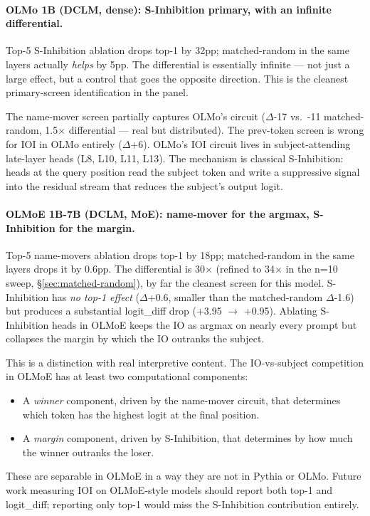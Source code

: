\documentclass[11pt]{article}
\begin{document}
\paragraph{OLMo 1B (DCLM, dense): S-Inhibition primary, with an infinite differential.}
Top-5 S-Inhibition ablation drops top-1 by 32pp; matched-random in the same layers actually \emph{helps} by 5pp. The differential is essentially infinite --- not just a large effect, but a control that goes the opposite direction. This is the cleanest primary-screen identification in the panel.

The name-mover screen partially captures OLMo's circuit ($\Delta$-17 vs.\ -11 matched-random, 1.5$\times$ differential --- real but distributed). The prev-token screen is wrong for IOI in OLMo entirely ($\Delta$+6). OLMo's IOI circuit lives in subject-attending late-layer heads (L8, L10, L11, L13). The mechanism is classical S-Inhibition: heads at the query position read the subject token and write a suppressive signal into the residual stream that reduces the subject's output logit.

\paragraph{OLMoE 1B-7B (DCLM, MoE): name-mover for the argmax, S-Inhibition for the margin.}
Top-5 name-movers ablation drops top-1 by 18pp; matched-random in the same layers drops it by 0.6pp. The differential is 30$\times$ (refined to 34$\times$ in the n=10 sweep, \S\ref{sec:matched-random}), by far the cleanest screen for this model. S-Inhibition has \emph{no top-1 effect} ($\Delta$+0.6, smaller than the matched-random $\Delta$-1.6) but produces a substantial logit\_diff drop (+3.95 $\to$ +0.95). Ablating S-Inhibition heads in OLMoE keeps the IO as argmax on nearly every prompt but collapses the margin by which the IO outranks the subject.

This is a distinction with real interpretive content. The IO-vs-subject competition in OLMoE has at least two computational components:
\begin{itemize}[topsep=2pt,itemsep=2pt]
\item A \emph{winner} component, driven by the name-mover circuit, that determines which token has the highest logit at the final position.
\item A \emph{margin} component, driven by S-Inhibition, that determines by how much the winner outranks the loser.
\end{itemize}
These are separable in OLMoE in a way they are not in Pythia or OLMo. Future work measuring IOI on OLMoE-style models should report both top-1 and logit\_diff; reporting only top-1 would miss the S-Inhibition contribution entirely.
\end{document}
